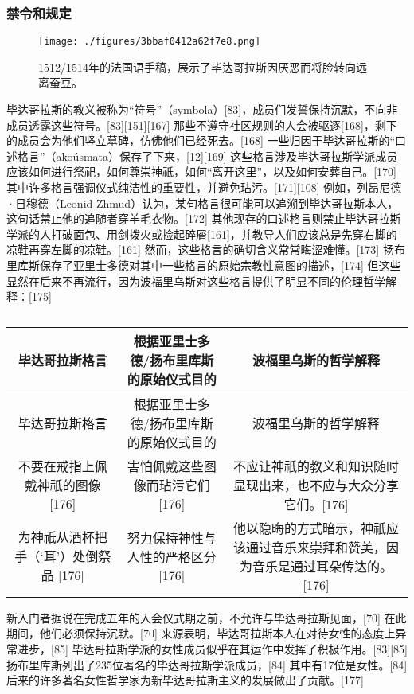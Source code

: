 \subsubsection{禁令和规定}
\begin{figure}[ht]
\centering
\texttt{[image: ./figures/3bbaf0412a62f7e8.png]}
\caption{1512/1514年的法国语手稿，展示了毕达哥拉斯因厌恶而将脸转向远离蚕豆。} \label{fig_Pythag_10}
\end{figure}
毕达哥拉斯的教义被称为“符号”（symbola）[83]，成员们发誓保持沉默，不向非成员透露这些符号。[83][151][167] 那些不遵守社区规则的人会被驱逐[168]，剩下的成员会为他们竖立墓碑，仿佛他们已经死去。[168] 一些归因于毕达哥拉斯的“口述格言”（akoúsmata）保存了下来，[12][169] 这些格言涉及毕达哥拉斯学派成员应该如何进行祭祀，如何尊崇神祇，如何“离开这里”，以及如何安葬自己。[170] 其中许多格言强调仪式纯洁性的重要性，并避免玷污。[171][108] 例如，列昂尼德·日穆德（Leonid Zhmud）认为，某句格言很可能可以追溯到毕达哥拉斯本人，这句话禁止他的追随者穿羊毛衣物。[172] 其他现存的口述格言则禁止毕达哥拉斯学派的人打破面包、用剑拨火或捡起碎屑[161]，并教导人们应该总是先穿右脚的凉鞋再穿左脚的凉鞋。[161] 然而，这些格言的确切含义常常晦涩难懂。[173] 扬布里库斯保存了亚里士多德对其中一些格言的原始宗教性意图的描述，[174] 但这些显然在后来不再流行，因为波福里乌斯对这些格言提供了明显不同的伦理哲学解释：[175]
\begin{table}[ht]
\centering
\caption\label{Pythagoras}
\begin{tabular}{|c|c|c}
\hline
\textbf{毕达哥拉斯格言} & \textbf{根据亚里士多德/扬布里库斯的原始仪式目的} & \textbf{波福里乌斯的哲学解释}\\
\hline 
毕达哥拉斯格言 & 根据亚里士多德/扬布里库斯的原始仪式目的 & 波福里乌斯的哲学解释\\ 
\hline
不要在戒指上佩戴神祇的图像 [176] & 害怕佩戴这些图像而玷污它们 [176] & 不应让神祇的教义和知识随时显现出来，也不应与大众分享它们。[176]\\
\hline
为神祇从酒杯把手（‘耳’）处倒祭品 [176] & 努力保持神性与人性的严格区分 [176] & 他以隐晦的方式暗示，神祇应该通过音乐来崇拜和赞美，因为音乐是通过耳朵传达的。[176]\\
\hline
\end{tabular}
\end{table}
新入门者据说在完成五年的入会仪式期之前，不允许与毕达哥拉斯见面，[70] 在此期间，他们必须保持沉默。[70] 来源表明，毕达哥拉斯本人在对待女性的态度上异常进步，[85] 毕达哥拉斯学派的女性成员似乎在其运作中发挥了积极作用。[83][85] 扬布里库斯列出了235位著名的毕达哥拉斯学派成员，[84] 其中有17位是女性。[84] 后来的许多著名女性哲学家为新毕达哥拉斯主义的发展做出了贡献。[177]
 
